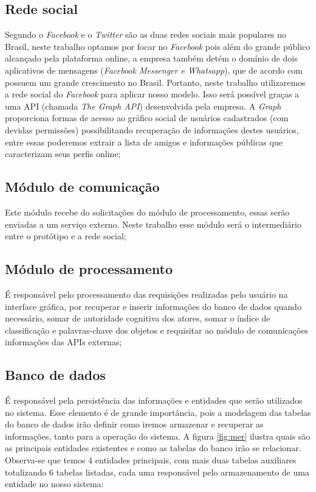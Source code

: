 \subsection{Rede social}
Segundo \cite{nic.br_pesquisa_2017} o \emph{Facebook} e o \emph{Twitter} são as duas redes sociais mais populares no Brasil, neste trabalho optamos por focar no \emph{Facebook} pois além do grande público alcançado pela plataforma online, a empresa também detém o domínio de dois aplicativos de mensagens (\emph{Facebook Messenger e Whatsapp}), que de acordo com \cite{nic_newman_digital_2017} possuem um grande crescimento no Brasil. Portanto, neste trabalho utilizaremos a rede social do \emph{Facebook} para aplicar nosso modelo. Isso será possível graças a uma API (chamada \emph{The Graph API}) desenvolvida pela empresa. A \emph{Graph} proporciona formas de acesso ao gráfico social de usuários cadastrados (com devidas permissões) possibilitando recuperação de informações destes usuários, entre essas poderemos extrair a lista de amigos e informações públicas que caracterizam seus perfis online;
   
\subsection{Módulo de comunicação}
Este módulo recebe do solicitações do módulo de processamento, essas serão enviadas a um serviço externo. Neste trabalho esse módulo será o intermediário entre o protótipo e a rede social;
    
\subsection{Módulo de processamento}
É responsável pelo processamento das requisições realizadas pelo usuário na interface gráfica, por recuperar e inserir informações do banco de dados quando necessário, somar de autoridade cognitiva dos atores, somar o índice de classificação e palavras-chave dos objetos e requisitar ao módulo de comunicações informações das APIs externas; 
    
\subsection{Banco de dados}
É responsável pela persistência das informações e entidades que serão utilizados no sistema. Esse elemento é de grande importância, pois a modelagem das tabelas do banco de dados irão definir como iremos armazenar e recuperar as informações, tanto para a operação do sistema. A figura \ref{fig:mer} ilustra quais são as principais entidades existentes e como as tabelas do banco irão se relacionar. Observa-se que temos 4 entidades principais, com mais duas tabelas auxiliares totalizando 6 tabelas listadas, cada uma responsável pelo armazenamento de uma entidade no nosso sistema: 

